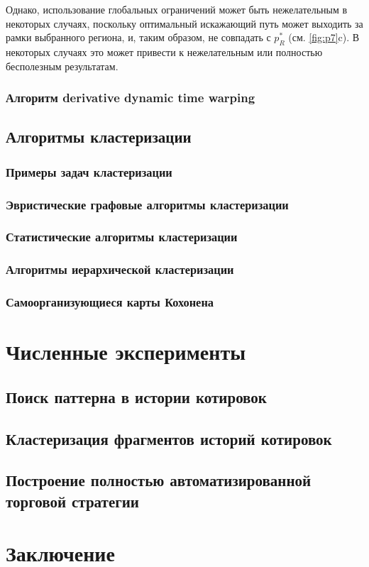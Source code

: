\documentclass[a4paper, 14pt]{extarticle}
\numberwithin{figure}{subsection}
\numberwithin{equation}{subsection}
\begin{document}
Однако, использование глобальных ограничений может быть нежелательным в некоторых случаях, поскольку оптимальный искажающий путь может выходить за рамки выбранного региона, и, таким образом, не совпадать с $p_R^*$ (см. \ref{fig:p7}c). В некоторых случаях это может привести к нежелательным или полностью бесполезным результатам.

\subsubsection{Алгоритм derivative dynamic time warping}
\subsection{Алгоритмы кластеризации}
\subsubsection{Примеры задач кластеризации}
\subsubsection{Эвристические графовые алгоритмы кластеризации}
\subsubsection{Статистические алгоритмы кластеризации}
\subsubsection{Алгоритмы иерархической кластеризации}
\subsubsection{Самоорганизующиеся карты Кохонена}
\section{Численные эксперименты}
\subsection{Поиск паттерна в истории котировок}
\subsection{Кластеризация фрагментов историй котировок}
\subsection{Построение полностью автоматизированной торговой стратегии}
\section*{Заключение}
\newpage{}

\end{document}
